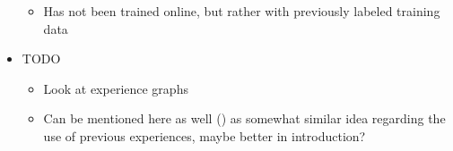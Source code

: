 \begin{itemize}
\begin{itemize}
		\item Has not been trained online, but rather with previously labeled training data
	\end{itemize}
	\item TODO
	\begin{itemize}
		\item Look at experience graphs
		\item Can be mentioned here as well (\cite{phillips2012graphs}) as somewhat similar idea regarding the use of previous experiences, maybe better in introduction?
	\end{itemize}
\end{itemize}
